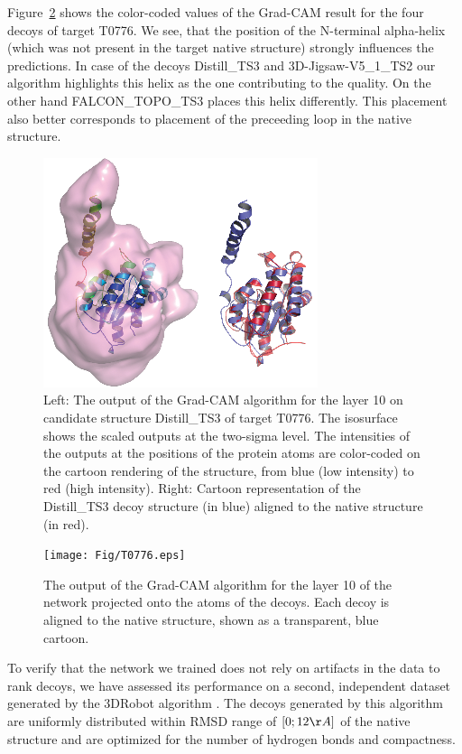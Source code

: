 Figure~\ref{Fig:GradCAMT0776_more} shows the color-coded
values of the Grad-CAM result for the four decoys of target T0776.
We see, that the position of the N-terminal alpha-helix (which was not present in the target native structure) 
strongly influences the predictions. In case of the decoys Distill\_TS3 and 3D-Jigsaw-V5\_1\_TS2 our algorithm 
highlights this helix as the one contributing to the quality. On the other hand FALCON\_TOPO\_TS3 places this helix 
differently. This placement also better corresponds to placement of the preceeding loop in the native structure.

\begin{figure}[H]
    \centering
    \includegraphics[width=0.5\linewidth]{Fig/FigT0776.eps}
%
    \caption{Left: The output of the Grad-CAM algorithm for the layer 10 on
    candidate structure Distill\_TS3 of target T0776. The isosurface
    shows the scaled outputs at the two-sigma level. The intensities
    of the outputs at the positions of the protein atoms are
    color-coded on the cartoon rendering of the structure, from blue
    (low intensity) to red (high intensity). Right: Cartoon
    representation of the Distill\_TS3 decoy structure (in blue)
    aligned to the native structure (in red).}
    \label{Fig:GradCAMT0776}
\end{figure}

\begin{figure}[H]
    \centering
    \texttt{[image: Fig/T0776.eps]}
%
    \caption{The output of the Grad-CAM algorithm for the layer 10 of the network
    projected onto the atoms of the decoys. Each decoy is aligned to
    the native structure, shown as a transparent, blue cartoon.}
    \label{Fig:GradCAMT0776_more}
\end{figure}

To verify that the network we trained does not rely on artifacts in
the data to rank decoys, we have assessed its performance on a second,
independent dataset generated by the 3DRobot
algorithm \cite{deng20163drobot}. The decoys generated by this
algorithm are uniformly distributed within RMSD range of $[0; 12\AA]$
of the native structure and are optimized for the number of hydrogen
bonds and compactness.

